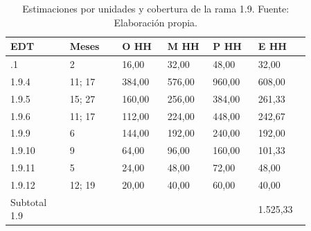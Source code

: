 \documentclass[11pt]{article}
\begin{document}
\begingroup
\small
\begin{longtable}{@{}p{0.17\linewidth}p{0.15\linewidth}p{0.13\linewidth}p{0.13\linewidth}p{0.13\linewidth}p{0.15\linewidth}@{}}
\caption[Estimaciones por unidades y cobertura de la rama 1.9]{Estimaciones por unidades y cobertura de la rama 1.9. Fuente: Elaboración propia.}\label{tab:t15-tareas-9}\\
\toprule
\textbf{EDT} & \textbf{Meses} & \textbf{O HH} & \textbf{M HH} & \textbf{P HH} & \textbf{E HH} \\
\midrule
\endhead
\bottomrule
\endlastfoot
1.9.1 & 2 & 16,00 & 32,00 & 48,00 & 32,00 \\
1.9.4 & 11; 17 & 384,00 & 576,00 & 960,00 & 608,00 \\
1.9.5 & 15; 27 & 160,00 & 256,00 & 384,00 & 261,33 \\
1.9.6 & 11; 17 & 112,00 & 224,00 & 448,00 & 242,67 \\
1.9.9 & 6 & 144,00 & 192,00 & 240,00 & 192,00 \\
1.9.10 & 9 & 64,00 & 96,00 & 160,00 & 101,33 \\
1.9.11 & 5 & 24,00 & 48,00 & 72,00 & 48,00 \\
1.9.12 & 12; 19 & 20,00 & 40,00 & 60,00 & 40,00 \\
Subtotal 1.9 &  &  &  &  & 1.525,33 \\
\end{longtable}
\endgroup
\end{document}
